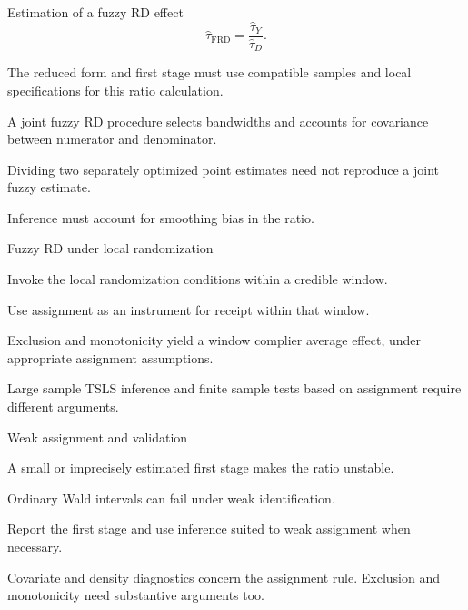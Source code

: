\begin{frame}{Estimation of a fuzzy RD effect}
\[
\widehat\tau_{\mathrm{FRD}}=\frac{\widehat\tau_Y}{\widehat\tau_D}.
\]
\begin{items}
\item The reduced form and first stage must use compatible samples and local specifications for this ratio calculation.
\item A joint fuzzy RD procedure selects bandwidths and accounts for covariance between numerator and denominator.
\item Dividing two separately optimized point estimates need not reproduce a joint fuzzy estimate.
\item Inference must account for smoothing bias in the ratio.
\end{items}
\end{frame}

\begin{frame}{Fuzzy RD under local randomization}
\begin{items}
\item Invoke the local randomization conditions within a credible window.
\item Use assignment as an instrument for receipt within that window.
\item Exclusion and monotonicity yield a window complier average effect, under appropriate assignment assumptions.
\item Large sample TSLS inference and finite sample tests based on assignment require different arguments.
\end{items}
\end{frame}

\begin{frame}{Weak assignment and validation}
\begin{items}
\item A small or imprecisely estimated first stage makes the ratio unstable.
\item Ordinary Wald intervals can fail under weak identification.
\item Report the first stage and use inference suited to weak assignment when necessary.
\item Covariate and density diagnostics concern the assignment rule. Exclusion and monotonicity need substantive arguments too.
\end{items}
\end{frame}

